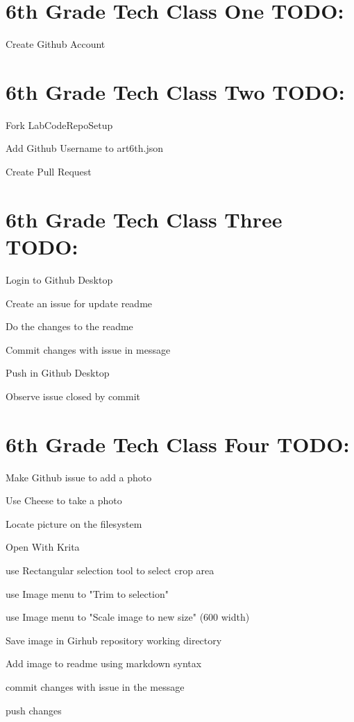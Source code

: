\documentclass{article}
\begin{document}
\newpage
\section{6th Grade Tech Class One TODO:}
\begin{todolist}
	\item Create Github Account
\end{todolist}


\section{6th Grade Tech Class Two TODO:}
\begin{todolist}
	\item Fork LabCodeRepoSetup
	\item Add Github Username to art6th.json
	\item Create Pull Request
\end{todolist}


\section{6th Grade Tech Class Three TODO:}
\begin{todolist}
	\item Login to Github Desktop
	\item Create an issue for update readme
	\item Do the changes to the readme
	\item Commit changes with issue in message
	\item Push in Github Desktop
	\item Observe issue closed by commit 
\end{todolist}


\section{6th Grade Tech Class Four TODO:}
\begin{todolist}
	\item Make  Github issue to add a photo
	\item Use Cheese to take a photo
	\item Locate picture on the filesystem
	\item Open With Krita
	\item use Rectangular selection tool to select crop area
	\item use Image menu to "Trim to selection"
	\item use Image menu to "Scale image to new size" (600 width) 
	\item Save image in Girhub repository working directory
	\item Add image to readme using markdown syntax
	\item commit changes with issue in the message
	\item push changes
\end{todolist}
\end{document}
